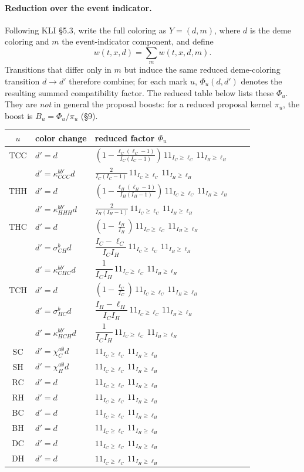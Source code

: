\documentclass[11pt]{article}
\newcommand{\ind}{1\!\!1}
\newcommand{\Supp}{\ind_{I_C\ge\ell_C}\,\ind_{I_H\ge\ell_H}}
\theoremstyle{plain}
\begin{document}
\paragraph{Reduction over the event indicator.} Following KLI \S5.3, write the full coloring as
$Y=(d,m)$, where $d$ is the deme coloring and $m$ the event-indicator component, and define
\[
w(t,x,d)=\sum_m w(t,x,d,m).
\]
Transitions that differ only in $m$ but induce the same reduced
deme-coloring transition $d\to d'$ therefore combine; for each mark $u$, $\Phi_u(d,d')$ denotes the
resulting summed compatibility factor. The reduced table below lists these $\Phi_u$. They are
\emph{not} in general the proposal boosts: for a reduced proposal kernel $\pi_u$, the boost is
$B_u=\Phi_u/\pi_u$ (\S9).
\begin{center}
{\small
\renewcommand{\arraystretch}{1.5}
\begin{tabular}{clllc}
\toprule
$u$ & color change & reduced factor $\Phi_u$\\
\midrule
TCC & $d'=d$ & $\left(1-\frac{\ell_C(\ell_C-1)}{I_C(I_C-1)}\right)\,\Supp$\\[1.6ex]
& $d'=\kappa^{bb'}_{CCC}d$ & $\frac{2}{I_C(I_C-1)}\,\Supp$\\[1.6ex]
THH & $d'=d$ & $\left(1-\frac{\ell_H(\ell_H-1)}{I_H(I_H-1)}\right)\,\Supp$\\[1.6ex]
& $d'=\kappa^{bb'}_{HHH}d$ & $\frac{2}{I_H(I_H-1)}\,\Supp$\\[1.6ex]
THC & $d'=d$ & $\left(1-\frac{\ell_H}{I_H}\right)\,\Supp$\\[1.6ex]
& $d'=\sigma^b_{CH}d$ & $\dfrac{I_C-\ell_C}{I_CI_H}\,\Supp$\\[1.6ex]
& $d'=\kappa^{bb'}_{CHC}d$ & $\dfrac{1}{I_CI_H}\,\Supp$\\[1.6ex]
TCH & $d'=d$ & $\left(1-\frac{\ell_C}{I_C}\right)\,\Supp$\\[1.6ex]
& $d'=\sigma^b_{HC}d$ & $\dfrac{I_H-\ell_H}{I_CI_H}\,\Supp$\\[1.6ex]
& $d'=\kappa^{bb'}_{HCH}d$ & $\dfrac{1}{I_CI_H}\,\Supp$\\[1.6ex]
SC & $d'=\chi^{a\emptyset}_C d$ & $\Supp$\\[1.6ex]
SH & $d'=\chi^{a\emptyset}_H d$ & $\Supp$\\[1.6ex]
RC & $d'=d$ & $\Supp$\\
RH & $d'=d$ & $\Supp$\\
BC & $d'=d$ & $\Supp$\\
BH & $d'=d$ & $\Supp$\\
DC & $d'=d$ & $\Supp$\\
DH & $d'=d$ & $\Supp$\\
\bottomrule
\end{tabular}}
\end{center}
\end{document}
